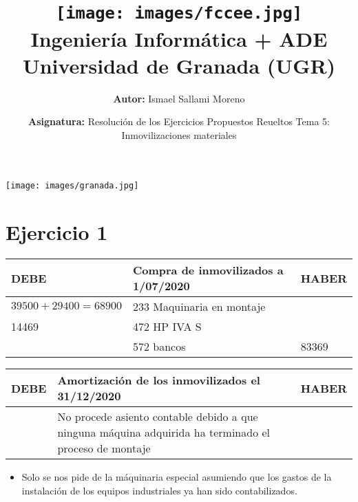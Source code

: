 \documentclass[a4paper,12pt]{article}
\title{
    \vspace{-2cm}
    \texttt{[image: images/fccee.jpg]} \\ %
    \LARGE Ingeniería Informática + ADE\\
    \large Universidad de Granada (UGR)\\[1cm]
}
\author{\textbf{Autor:} Ismael Sallami Moreno}
\date{\textbf{Asignatura:} Resolución de los Ejercicios Propuestos Reueltos Tema 5: Inmovilizaciones materiales
}
\begin{document}
\maketitle
\thispagestyle{empty}

\begin{center}
    \texttt{[image: images/granada.jpg]} \\ %
    \vfill
\end{center}

\newpage

\tableofcontents
\newpage

\section{Ejercicio 1}

\begin{table}[H]
    \centering
    \begin{tabular}{|p{3cm}|p{6cm}|p{3cm}|}
    \hline
    \textbf{DEBE} & \textbf{Compra de inmovilizados a 1/07/2020} & \textbf{HABER} \\
    \hline
    $39500+29400=68900$& 233 Maquinaria en montaje& \\
    \hline
    14469 & 472 HP IVA S& \\
    \hline
    & 572 bancos & 83369\\
    \hline
    \end{tabular}
\end{table}

\begin{table}[H]
    \centering
    \begin{tabular}{|p{3cm}|p{6cm}|p{3cm}|}
    \hline
    \textbf{DEBE} & \textbf{Amortización de los inmovilizados el 31/12/2020} & \textbf{HABER} \\
    \hline
    & No procede asiento contable debido a que ninguna máquina adquirida ha terminado el proceso de montaje& \\
    \hline
    \end{tabular}
\end{table}

\begin{itemize}
    \item Solo se nos pide de la máquinaria especial asumiendo que los gastos de la instalación de los equipos industriales ya han sido contabilizados.
\end{itemize}
\end{document}
